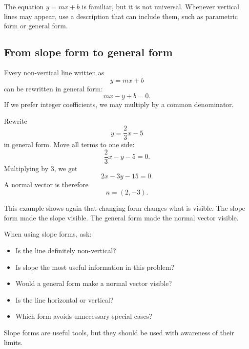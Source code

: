 \begin{remarkbox}
The equation \(y=mx+b\) is familiar, but it is not universal. Whenever vertical lines may appear, use a description that can include them, such as parametric form or general form.
\end{remarkbox}

\subsection*{From slope form to general form}

Every non-vertical line written as
\[
y=mx+b
\]
can be rewritten in general form:
\[
mx-y+b=0.
\]
If we prefer integer coefficients, we may multiply by a common denominator.

\begin{examplebox}
Rewrite
\[
y=\frac23x-5
\]
in general form. Move all terms to one side:
\[
\frac23x-y-5=0.
\]
Multiplying by \(3\), we get
\[
2x-3y-15=0.
\]
A normal vector is therefore
\[
n=(2,-3).
\]
\end{examplebox}

This example shows again that changing form changes what is visible. The slope form made the slope visible. The general form made the normal vector visible.

\begin{summarybox}
When using slope forms, ask:
\begin{itemize}
\item Is the line definitely non-vertical?
\item Is slope the most useful information in this problem?
\item Would a general form make a normal vector visible?
\item Is the line horizontal or vertical?
\item Which form avoids unnecessary special cases?
\end{itemize}
\end{summarybox}

Slope forms are useful tools, but they should be used with awareness of their limits.